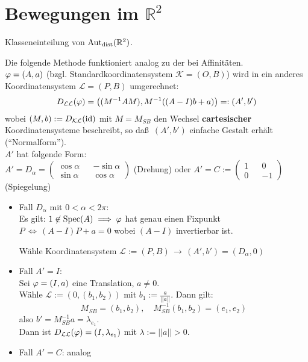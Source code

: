 \documentclass[parskip,a4paper,twoside,DIV15,BCOR12mm]{scrbook}
\begin{document}
\section{Bewegungen im $\mathbb{R}^2$}
\begin{task}
Klasseneinteilung von $\operatorname{Aut_{dist}}(\mathbb{R}^2)$.
\end{task}

\begin{method}
Die folgende Methode funktioniert analog zu der bei Affinitäten.\\ 
$\varphi=(A,a)$ (bzgl. Standardkoordinatensystem $\mathcal{K}=(O,B)$) wird in ein 
anderes Koordinatensystem $\mathcal{L}=(P,B)$ umgerechnet:
\[D_{\mathcal{L}\mathcal{L}}(\varphi)=\left((M^{-1}AM),M^{-1}((A-I)b+a)\right)=:(A',b')\]
wobei $(M,b):=D_{\mathcal{K}\mathcal{L}}(\operatorname{id})$ mit $M=M_{SB}$ den Wechsel \textbf{cartesischer}
Koordinatensysteme beschreibt, so da\ss \ \((A',b')\) einfache Gestalt erh\"alt 
(``Normalform'').\\
\(A'\) hat folgende Form:\\
\(A'=D_{\alpha}=
\begin{pmatrix}
\cos\alpha&&-\sin\alpha\\
\sin\alpha&&\cos\alpha
\end{pmatrix}\) (Drehung) oder \(A'=C:=
\begin{pmatrix}
1&&0\\
0&&-1
\end{pmatrix}\) (Spiegelung)
\begin{itemize}
\item Fall \(D_{\alpha}\) mit \(0<\alpha <2\pi\):\\
Es gilt: \(1\not\in\text{Spec}(A) \implies \varphi\) hat genau einen Fixpunkt 
\(P\,\Longleftrightarrow\,(A-I)P+a=0\) wobei \((A-I)\) invertierbar ist.

W\"ahle Koordinatensystem \(\mathcal{L}:=(P,B)\,\rightarrow\,(A',b')=(D_{\alpha},0)\)
\item Fall \(A'=I\):\\
Sei \(\varphi=(I,a)\) eine Translation, \(a\neq 0\).\\
W\"ahle \(\mathcal{L}:=(0,(b_{1},b_{2}))\) mit \(b_{1}:=\frac{a}{||a||}\). Dann
gilt:
\[
M_{SB} = (b_{1},b_{2}),\quad M_{SB}^{-1}(b_{1},b_{2})=(e_{1},e_{2})
\]
also \(b'=M_{SB}^{-1}a=\lambda_{e_{1}}\).\\
Dann ist \(D_{\mathcal{L}\mathcal{L}}(\varphi)=(I,\lambda_{e_{1}})\) mit 
\(\lambda:=||a||>0\).
\item Fall \(A'=C\): analog
\end{itemize}
\end{method}
\end{document}
